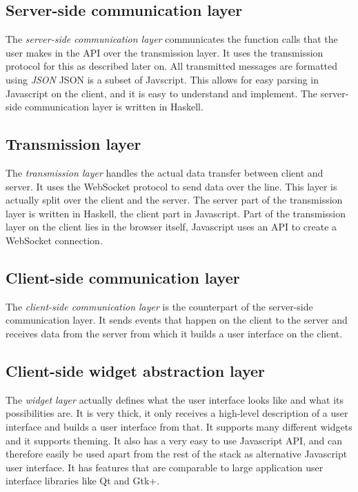 \documentclass[11pt,a4paper]{article}
\begin{document}
\subsection{Server-side communication layer}
The \textit{server-side communication layer} communicates the function calls that the user makes in the API over the transmission layer.
It uses the transmission protocol for this as described later on.
All transmitted messages are formatted using \textit{JSON}
JSON is a subset of Javscript.
This allows for easy parsing in Javascript on the client, and it is easy to understand and implement.
The server-side communication layer is written in Haskell.

\subsection{Transmission layer}

The \textit{transmission layer} handles the actual data transfer between client and server.
It uses the WebSocket protocol to send data over the line.
This layer is actually split over the client and the server.
The server part of the transmission layer is written in Haskell, the client part in Javascript.
Part of the transmission layer on the client lies in the browser itself, Javascript uses an API to create a WebSocket connection.


\subsection{Client-side communication layer}

The \textit{client-side communication layer} is the counterpart of the server-side communication layer.
It sends events that happen on the client to the server and receives data from the server from which it builds a user interface on the client.

\subsection{Client-side widget abstraction layer}

The \textit{widget layer} actually defines what the user interface looks like and what its possibilities are.
It is very thick, it only receives a high-level description of a user interface and builds a user interface from that.
It supports many different widgets and it supports theming.
It also has a very easy to use Javascript API, and can therefore easily be used apart from the rest of the stack as alternative Javascript user interface.
It has features that are comparable to large application user interface libraries like Qt and Gtk+.
\end{document}
